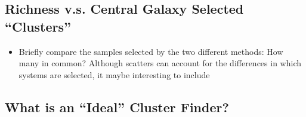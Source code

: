 \documentclass[a4paper,fleqn,usenatbib]{mnras}
\begin{document}
\subsection{Richness v.s. Central Galaxy Selected ``Clusters''}
    \label{sec:cause_of_difference}
    
    
    
    \begin{itemize}
    
        \item Briefly compare the samples selected by the two different methods: How many in 
            common? Although scatters can account for the differences in which systems are selected,
            it maybe interesting to include 
        
    \end{itemize}

\subsection{What is an ``Ideal'' Cluster Finder?}
    \label{sec:perfect_finder}

\end{document}
